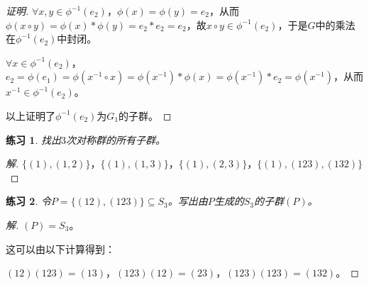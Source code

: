 \documentclass{article}
\newtheorem{Exercise}{练习}
\begin{document}
\begin{CJK*}{UTF8}{gbsn}
\begin{proof}[证明]
  $\forall x,y\in \phi^{-1}(e_2)$，$\phi(x)=\phi(y)=e_2$，从而$\phi(x\circ y)=\phi(x)*\phi(y)=e_2*e_2=e_2$，故$x\circ y\in \phi^{-1}(e_2)$，于是$G$中的乘法在$\phi^{-1}(e_2)$中封闭。

$\forall x\in \phi^{-1}(e_2)$，$e_2=\phi(e_1)=\phi(x^{-1}\circ x)=\phi(x^{-1})*\phi(x)=\phi(x^{-1})*e_2=\phi(x^{-1})$，从而$x^{-1}\in \phi^{-1}(e_2)$。

以上证明了$\phi^{-1}(e_2)$为$G_1$的子群。
\end{proof}
\begin{Exercise}
  找出$3$次对称群的所有子群。
\end{Exercise}
\begin{proof}[解]
  $\{(1),(1,2)\}$，$\{(1),(1,3)\}$，$\{(1),(2,3)\}$，$\{(1),(123),(132)\}$
\end{proof}

\begin{Exercise}
  令$P=\{(12),(123)\}\subseteq S_3$。写出由$P$生成的$S_3$的子群$(P)$。
\end{Exercise}
\begin{proof}[解]
  $(P)=S_3$。

  这可以由以下计算得到：

  $(12)(123)=(13)$，$(123)(12)=(23)$，$(123)(123)=(132)$。
\end{proof}
\end{CJK*}
\end{document}
